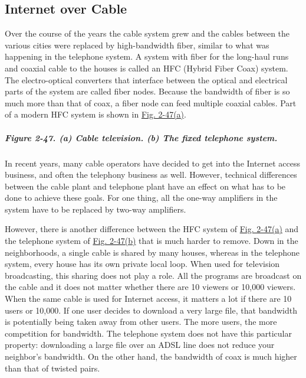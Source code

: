 \documentclass[b5paper,11pt]{memoir}
\begin{document}
\subsection{Internet over Cable}

Over the course of the years the cable system grew and the cables
between the various cities were replaced by high-bandwidth fiber,
similar to what was happening in the telephone system. A system with
fiber for the long-haul runs and coaxial cable to the houses is called
an {HFC} ({Hybrid Fiber Coax}) system. The electro-optical converters
that interface between the optical and electrical parts of the system
are called {fiber nodes}. Because the bandwidth of fiber is so much more
than that of coax, a fiber node can feed multiple coaxial cables. Part
of a modern HFC system is shown in
\protect\hyperlink{0130661023_ch02lev1sec7.htmlux5cux23ch02fig47}{Fig.
2-47(a)}.

\subparagraph[Figure 2-47. (a) Cable television. (b) The fixed telephone
system.]{\texorpdfstring{\protect\hypertarget{0130661023_ch02lev1sec7.htmlux5cux23ch02fig47}{}{}Figure
2-47. (a) Cable television. (b) The fixed telephone
system.}{Figure 2-47. (a) Cable television. (b) The fixed telephone system.}}


In recent years, many cable operators have decided to get into the
Internet access business, and often the telephony business as well.
However, technical differences between the cable plant and telephone
plant have an effect on what has to be done to achieve these goals. For
one thing, all the one-way amplifiers in the system have to be replaced
by two-way amplifiers.

However, there is another difference between the HFC system of
\protect\hyperlink{0130661023_ch02lev1sec7.htmlux5cux23ch02fig47}{Fig.
2-47(a)} and the telephone system of
\protect\hyperlink{0130661023_ch02lev1sec7.htmlux5cux23ch02fig47}{Fig.
2-47(b)} that is much harder to remove. Down in the neighborhoods, a
single cable is shared by many houses, whereas in the telephone system,
every house has its own private local loop. When used for television
broadcasting, this sharing does not play a role. All the programs are
broadcast on the cable and it does not matter whether there are 10
viewers or 10,000 viewers. When the same cable is used for Internet
access, it matters a lot if there are 10 users or 10,000. If one user
decides to download a very large file, that bandwidth is potentially
being taken away from other users. The more users, the more competition
for bandwidth. The telephone system does not have this particular
property: downloading a large file over an ADSL line does not reduce
your neighbor's bandwidth. On the other hand, the bandwidth of coax is
much higher than that of twisted pairs.
\end{document}
